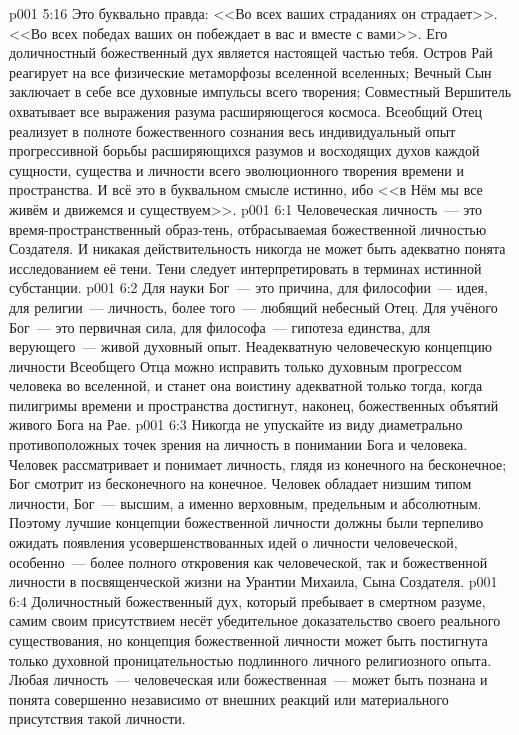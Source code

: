 \vs p001 5:16 Это буквально правда: <<Во всех ваших страданиях он страдает>>. <<Во всех победах ваших он побеждает в вас и вместе с вами>>. Его доличностный божественный дух является настоящей частью тебя. Остров Рай реагирует на все физические метаморфозы вселенной вселенных; Вечный Сын заключает в себе все духовные импульсы всего творения; Совместный Вершитель охватывает все выражения разума расширяющегося космоса. Всеобщий Отец реализует в полноте божественного сознания весь индивидуальный опыт прогрессивной борьбы расширяющихся разумов и восходящих духов каждой сущности, существа и личности всего эволюционного творения времени и пространства. И всё это в буквальном смысле истинно, ибо <<в Нём мы все живём и движемся и существуем>>.
\vs p001 6:1 Человеческая личность~--- это время\hyp{}пространственный образ\hyp{}тень, отбрасываемая божественной личностью Создателя. И никакая действительность никогда не может быть адекватно понята исследованием её тени. Тени следует интерпретировать в терминах истинной субстанции.
\vs p001 6:2 \pc Для науки Бог~--- это причина, для философии~--- идея, для религии~--- личность, более того~--- любящий небесный Отец. Для учёного Бог~--- это первичная сила, для философа~--- гипотеза единства, для верующего~--- живой духовный опыт. Неадекватную человеческую концепцию личности Всеобщего Отца можно исправить только духовным прогрессом человека во вселенной, и станет она воистину адекватной только тогда, когда пилигримы времени и пространства достигнут, наконец, божественных объятий живого Бога на Рае.
\vs p001 6:3 Никогда не упускайте из виду диаметрально противоположных точек зрения на личность в понимании Бога и человека. Человек рассматривает и понимает личность, глядя из конечного на бесконечное; Бог смотрит из бесконечного на конечное. Человек обладает низшим типом личности, Бог~--- высшим, а именно верховным, предельным и абсолютным. Поэтому лучшие концепции божественной личности должны были терпеливо ожидать появления усовершенствованных идей о личности человеческой, особенно~--- более полного откровения как человеческой, так и божественной личности в посвященческой жизни на Урантии Михаила, Сына Создателя.
\vs p001 6:4 \pc Доличностный божественный дух, который пребывает в смертном разуме, самим своим присутствием несёт убедительное доказательство своего реального существования, но концепция божественной личности может быть постигнута только духовной проницательностью подлинного личного религиозного опыта. Любая личность~--- человеческая или божественная~--- может быть познана и понята совершенно независимо от внешних реакций или материального присутствия такой личности.

